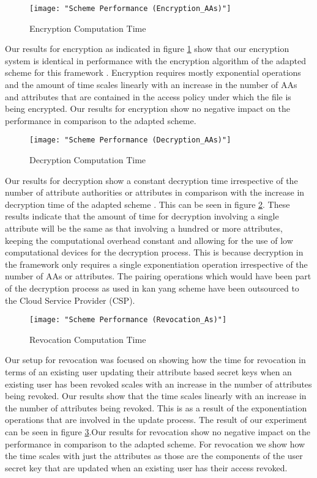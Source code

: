 \begin{figure}[]
	\centering
	\texttt{[image: "Scheme Performance (Encryption\_AAs)"]}
	\caption{Encryption Computation Time}
	\label{fig:res_enc_aas}
\end{figure}

Our results for encryption as indicated in figure \ref{fig:res_enc_aas} show that our encryption system is identical in performance with the encryption algorithm of the adapted scheme for this framework \cite{Yang2014}. Encryption requires mostly exponential operations and the amount of time scales linearly with an increase in the number of AAs and attributes that are contained in the access policy under which the file is being encrypted. Our results for encryption show no negative impact on the performance in comparison to the adapted scheme.

\begin{figure}[]
	\centering
	\texttt{[image: "Scheme Performance (Decryption\_AAs)"]}
	\caption{Decryption Computation Time}
	\label{fig:res_dec_aas}
\end{figure}

Our results for decryption show a constant decryption time irrespective of the number of attribute authorities or attributes in comparison with the increase in decryption time of the adapted scheme \cite{Yang2014}. This can be seen in figure \ref{fig:res_dec_aas}. These results indicate that the amount of time for decryption involving a single attribute will be the same as that involving a hundred or more attributes, keeping the computational overhead constant and allowing for the use of low computational devices for the decryption process. This is because decryption in the framework only requires a single exponentiation operation irrespective of the number of AAs or attributes. The pairing operations which would have been part of the decryption process as used in kan yang scheme\cite{Yang2014} have been outsourced to the Cloud Service Provider (CSP).

\begin{figure}[]
	\centering
	\texttt{[image: "Scheme Performance (Revocation\_As)"]}
	\caption{Revocation Computation Time}
	\label{fig:res_rev_as}
\end{figure}

Our setup for revocation was focused on showing how the time for revocation in terms of an existing user updating their attribute based secret keys when an existing user has been revoked scales with an increase in the number of attributes being revoked. Our results show that the time scales linearly with an increase in the number of attributes being revoked. This is as a result of the exponentiation operations that are involved in the update process. The result of our experiment can be seen in figure \ref{fig:res_rev_as}.Our results for revocation show no negative impact on the performance in comparison to the adapted scheme. For revocation we show how the time scales with just the attributes as those are the components of the user secret key that are updated when an existing user has their access revoked.


